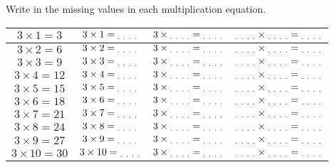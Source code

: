 \documentclass[12pt]{article}
\begin{document}
Write in the missing values in each multiplication equation.
\begin{center}
\begin{tabular}{|c|c|c|c|}
\hline
$ 3 \times 1 = 3 $ & $ 3 \times 1 = \textsubscript{. . . .} $ & $ 3 \times \textsubscript{. . . .} = \textsubscript{. . . .} $ & $ \textsubscript{. . . .} \times \textsubscript{. . . .} = \textsubscript{. . . .} $ \\ \hline
$ 3 \times 2 = 6 $ & $ 3 \times 2 = \textsubscript{. . . .} $ & $ 3 \times \textsubscript{. . . .} = \textsubscript{. . . .} $ & $ \textsubscript{. . . .} \times \textsubscript{. . . .} = \textsubscript{. . . .} $ \\ \hline
$ 3 \times 3 = 9 $ & $ 3 \times 3 = \textsubscript{. . . .} $ & $ 3 \times \textsubscript{. . . .} = \textsubscript{. . . .} $ & $ \textsubscript{. . . .} \times \textsubscript{. . . .} = \textsubscript{. . . .} $ \\ \hline
$ 3 \times 4 = 12 $ & $ 3 \times 4 = \textsubscript{. . . .} $ & $ 3 \times \textsubscript{. . . .} = \textsubscript{. . . .} $ & $ \textsubscript{. . . .} \times \textsubscript{. . . .} = \textsubscript{. . . .} $ \\ \hline
$ 3 \times 5 = 15 $ & $ 3 \times 5 = \textsubscript{. . . .} $ & $ 3 \times \textsubscript{. . . .} = \textsubscript{. . . .} $ & $ \textsubscript{. . . .} \times \textsubscript{. . . .} = \textsubscript{. . . .} $ \\ \hline
$ 3 \times 6 = 18 $ & $ 3 \times 6 = \textsubscript{. . . .} $ & $ 3 \times \textsubscript{. . . .} = \textsubscript{. . . .} $ & $ \textsubscript{. . . .} \times \textsubscript{. . . .} = \textsubscript{. . . .} $ \\ \hline
$ 3 \times 7 = 21 $ & $ 3 \times 7 = \textsubscript{. . . .} $ & $ 3 \times \textsubscript{. . . .} = \textsubscript{. . . .} $ & $ \textsubscript{. . . .} \times \textsubscript{. . . .} = \textsubscript{. . . .} $ \\ \hline
$ 3 \times 8 = 24 $ & $ 3 \times 8 = \textsubscript{. . . .} $ & $ 3 \times \textsubscript{. . . .} = \textsubscript{. . . .} $ & $ \textsubscript{. . . .} \times \textsubscript{. . . .} = \textsubscript{. . . .} $ \\ \hline
$ 3 \times 9 = 27 $ & $ 3 \times 9 = \textsubscript{. . . .} $ & $ 3 \times \textsubscript{. . . .} = \textsubscript{. . . .} $ & $ \textsubscript{. . . .} \times \textsubscript{. . . .} = \textsubscript{. . . .} $ \\ \hline
$ 3 \times 10 = 30 $ & $ 3 \times 10 = \textsubscript{. . . .} $ & $ 3 \times \textsubscript{. . . .} = \textsubscript{. . . .} $ & $ \textsubscript{. . . .} \times \textsubscript{. . . .} = \textsubscript{. . . .} $ \\ \hline

\end{tabular}
\end{center}
\end{document}
